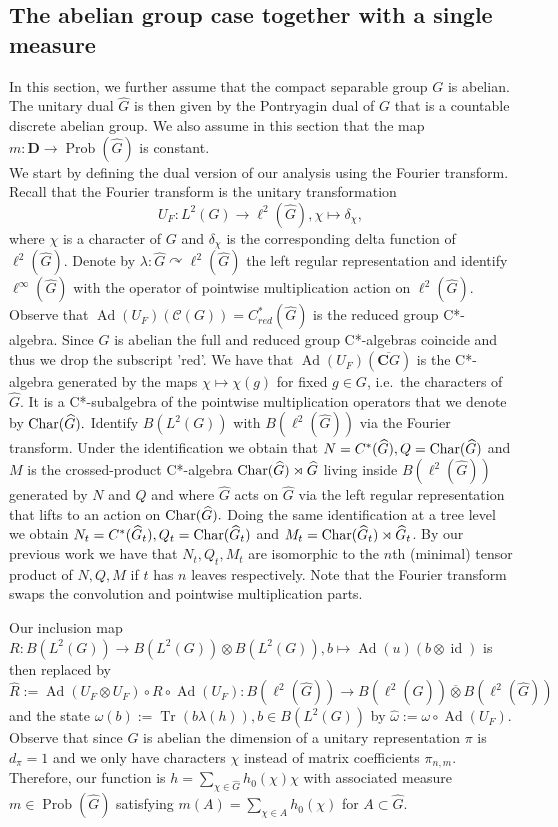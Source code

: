 \documentclass[a4paper,12pt]{amsart}
\numberwithin{equation}{section}
\theoremstyle{definition}
\DeclareMathOperator{\id}{id}
\newcommand{\act}{\curvearrowright}
\DeclareMathOperator{\Ad}{Ad}
\newcommand{\scrC}{\mathscr C}
\newcommand{\C}{\mathbf C}
\newcommand{\Ch}{\textup{Char}}
\newcommand{\D}{\mathbf D}
\newcommand{\la}{\lambda}
\newcommand{\ot}{\otimes}\newcommand{\otmin}{\otimes_{\text{min}}}
\newcommand{\ovt}{\overline\otimes}
\DeclareMathOperator{\Prob}{Prob}
\DeclareMathOperator{\Tr}{Tr}
\newcommand{\wh}{\widehat}
\begin{document}
\subsection{The abelian group case together with a single measure}
\label{sec:Gabelian}
In this section, we further assume that the compact separable group $G$ is abelian.
The unitary dual $\wh G$ is then given by the Pontryagin dual of $G$ that is a countable discrete abelian group. We also assume in this section that the map $m:\D\to \Prob(\wh G)$ is constant.\\[0.1cm]
We start by defining the dual version of our analysis using the Fourier transform.
Recall that the Fourier transform is the unitary transformation 
$$U_F: L^2(G)\to \ell^2(\wh G), \chi\mapsto \delta_\chi,$$
where $\chi$ is a character of $G$ and $\delta_\chi$ is the corresponding delta function of $\ell^2(\wh G).$
Denote by $\la:\wh G\act \ell^2(\wh G)$ the left regular representation and identify $ \ell^\infty(\wh G)$ with the operator of pointwise multiplication action on $\ell^2(\wh G).$
Observe that $\Ad(U_F)(\scrC(G)) =C_{red}^*(\wh G)$ is the reduced group C*-algebra.
Since $\wh G$ is abelian the full and reduced group C*-algebras coincide and thus we drop the subscript 'red'.
We have that $\Ad(U_F)(\overline{\C G})$ is the C*-algebra generated by the maps $\chi\mapsto \chi(g)$ for fixed $g\in G$, i.e.~the characters of $\wh G$.
It is a C*-subalgebra of the pointwise multiplication operators that we denote by $\Ch(\wh G).$
Identify $B(L^2(G))$ with $B(\ell^2(\wh G))$ via the Fourier transform.
Under the identification we obtain that $N=C^*(\wh G), Q=\Ch(\wh G)$ and $M$ is the crossed-product C*-algebra $\Ch(\wh G)\rtimes \wh G$ living inside $B(\ell^2(\wh G))$ generated by $N$ and $Q$ and where $\wh G$ acts on $\wh G$ via the left regular representation that lifts to an action on $\Ch(\wh G).$
Doing the same identification at a tree level we obtain $N_t=C^*(\wh G_t), Q_t=\Ch(\wh G_t)$ and $M_t= \Ch(\wh G_t)\rtimes \wh G_t$.
By our previous work we have that $N_t,Q_t,M_t$ are isomorphic to the $n$th (minimal) tensor product of $N,Q,M$ if $t$ has $n$ leaves respectively.
Note that the Fourier transform swaps the convolution and pointwise multiplication parts.

Our inclusion map $R:B(L^2(G))\to B(L^2(G))\ot B(L^2( G)), b\mapsto \Ad(u)(b\ot \id)$ is then replaced by 
$$\wh R:= \Ad(U_F\ot U_F) \circ R\circ \Ad(U_F): B(\ell^2(\wh G)) \to B(\ell^2(\wh G))\ovt B(\ell^2(\wh G))$$
and the state $\omega(b):=\Tr(b \la(h)), b\in B(L^2(G))$  by $\wh \omega:= \omega\circ\Ad(U_F).$
Observe that since $G$ is abelian the dimension of a unitary representation $\pi$ is $d_\pi=1$ and we only have characters $\chi$ instead of matrix coefficients $\pi_{n,m}.$
Therefore, our function is $h=\sum_{\chi\in\wh G} h_0(\chi) \chi$ with associated measure $m\in \Prob(\wh G)$ satisfying $m(A)=\sum_{\chi\in A} h_0(\chi)$ for $A\subset\wh G.$
\end{document}
